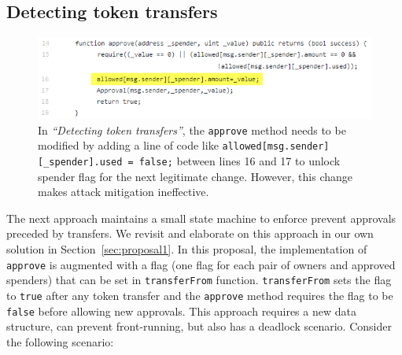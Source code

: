 
\subsection{Detecting token transfers}

\begin{figure}[t]
	\centering
	\includegraphics[width=1.0\linewidth]{figures/multiple_withdrawal_33.png}
	\caption{In \textit{``Detecting token transfers''}, the \texttt{approve} method needs to be modified by adding a line of code like \texttt{allowed[msg.sender][\_spender].used = false;} between lines 16 and 17 to unlock spender flag for the next legitimate change. However, this change makes attack mitigation ineffective.\label{fig:det}}
\end{figure}

The next approach \cite{Ref17} maintains a small state machine to enforce prevent approvals preceded by transfers. We revisit and elaborate on this approach in our own solution in Section~\ref{sec:proposal1}. In this proposal, the implementation of \texttt{approve} is augmented with a flag (one flag for each pair of owners and approved spenders) that can be set in \texttt{transferFrom} function. \texttt{transferFrom} sets the flag to \texttt{true} after any token transfer and the \texttt{approve} method requires the flag to be \texttt{false} before allowing new approvals. This approach requires a new data structure, can prevent front-running, but also has a deadlock scenario. Consider the following scenario:

